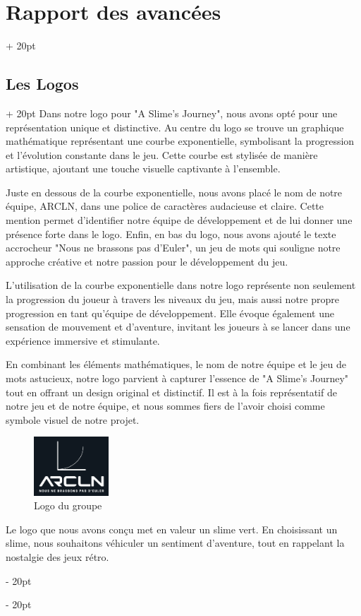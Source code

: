 \documentclass[a4paper, 12pt, twoside]{article}
\newcommand{\ind}[1][20pt]{\advance\leftskip + #1}
\newcommand{\deind}[1][20pt]{\advance\leftskip - #1}
\newenvironment{indt}[2][20pt]{#2 \par \ind[#1]}{\par \deind} %
\begin{document}
\begin{indt}{\section{Rapport des avancées}}
\begin{indt}{\subsection{Les Logos}}
            Dans notre logo pour "A Slime's Journey", nous avons opté pour une représentation unique et distinctive. Au centre du logo se trouve un graphique mathématique représentant une courbe exponentielle, symbolisant la progression et l'évolution constante dans le jeu. Cette courbe est stylisée de manière artistique, ajoutant une touche visuelle captivante à l'ensemble.

            Juste en dessous de la courbe exponentielle, nous avons placé le nom de notre équipe, ARCLN, dans une police de caractères audacieuse et claire. Cette mention permet d'identifier notre équipe de développement et de lui donner une présence forte dans le logo. Enfin, en bas du logo, nous avons ajouté le texte accrocheur "Nous ne brassons pas d'Euler", un jeu de mots qui souligne notre approche créative et notre passion pour le développement du jeu.

            L'utilisation de la courbe exponentielle dans notre logo représente non seulement la progression du joueur à travers les niveaux du jeu, mais aussi notre propre progression en tant qu'équipe de développement. Elle évoque également une sensation de mouvement et d'aventure, invitant les joueurs à se lancer dans une expérience immersive et stimulante.

            En combinant les éléments mathématiques, le nom de notre équipe et le jeu de mots astucieux, notre logo parvient à capturer l'essence de "A Slime's Journey" tout en offrant un design original et distinctif. Il est à la fois représentatif de notre jeu et de notre équipe, et nous sommes fiers de l'avoir choisi comme symbole visuel de notre projet.

            \begin{figure}[h]
                \centering
                \includegraphics[width=0.25\textwidth]{Logo2.png}
                \caption{Logo du groupe}
                \label{fig:mesh1}
            \end{figure}

            Le logo que nous avons conçu met en valeur un slime vert. En choisissant un slime, nous souhaitons véhiculer un sentiment d’aventure, tout en rappelant la nostalgie des jeux rétro.


\end{indt}
\end{indt}
\end{document}
